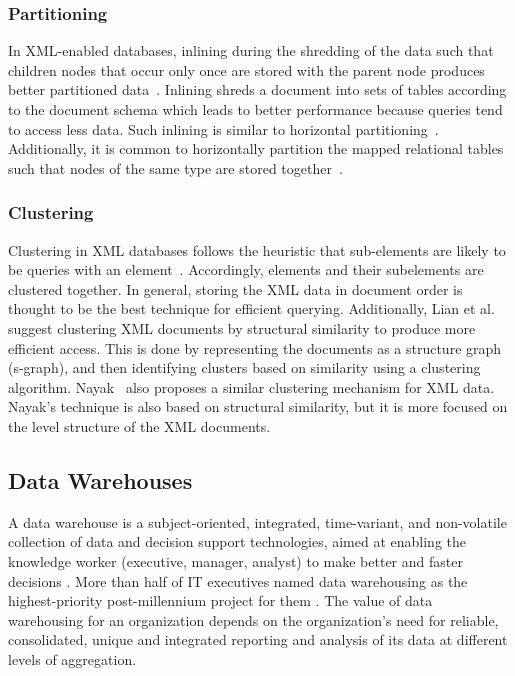 \documentclass[12pt,a4paper]{article}
\begin{document}
\subsubsection{Partitioning}
In XML-enabled databases, inlining during the shredding of the data such that children nodes that occur only once are stored with the parent node produces
better partitioned data~\cite{tatarinov2002storing}. Inlining shreds a document into sets of tables according to the document schema which leads to better
performance because queries tend to access less data. Such inlining is similar to horizontal partitioning~\cite{ramanath2003searching}. Additionally, it is
common to horizontally partition the mapped relational tables such that nodes of the same type are stored together~\cite{amer2002overview}.

\subsubsection{Clustering}
Clustering in XML databases follows the heuristic that sub-elements are likely to be queries with an element~\cite{jagadish2002timber}. Accordingly, elements
and their subelements are clustered together. In general, storing the XML data in document order is thought to be the best technique for efficient querying.
Additionally, Lian et al.~\cite{lian2004efficient} suggest clustering XML documents by structural similarity to produce more efficient access. This is done by
representing the documents as a structure graph (s-graph), and then identifying clusters based on similarity using a clustering algorithm.
Nayak~\cite{nayak2008fast} also proposes a similar clustering mechanism for XML data. Nayak's technique is also based on structural similarity, but it is more
focused on the level structure of the XML documents.


\subsection{Data Warehouses}
\label{SEC-WAREHOUSES}
A data warehouse is a subject-oriented, integrated, time-variant, and non-volatile collection of data and decision support technologies, aimed at enabling the
knowledge worker (executive, manager, analyst) to make better and faster decisions \cite{inmon2002building, chaudhuri1997overview}. More than half of IT
executives named data warehousing as the highest-priority post-millennium project for them \cite{sen2005comparison}. The value of data warehousing for an
organization depends on the organization's need for reliable, consolidated, unique and integrated reporting and analysis of its data at different levels of
aggregation.
\end{document}
